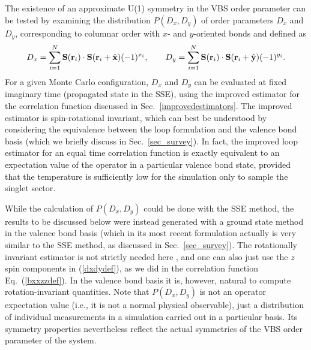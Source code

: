 \documentclass[draft,numberedheadings]{aipproc}
\begin{document}
The existence of an approximate U(1) symmetry in the VBS order parameter can be tested by examining the distribution $P(D_x,D_y)$ of order 
parameters $D_x$ and $D_y$, corresponding to columnar order with $x$- and $y$-oriented bonds and defined as
\begin{equation}
D_{x}=\sum_{i=1}^N {\bf S}({\bf r}_i)\cdot {\bf S}({\bf r}_i+\hat {\bf x})(-1)^{x_i} ,~~~~~~
D_{y}=\sum_{i=1}^N {\bf S}({\bf r}_i)\cdot {\bf S}({\bf r}_i+\hat {\bf y})(-1)^{y_i} .
\label{dxdydef}
\end{equation}
For a given Monte Carlo configuration, $D_x$ and $D_y$ can be evaluated at fixed imaginary time (propagated state in the SSE), using the improved 
estimator for the correlation function discussed in Sec.~\ref{improvedestimators}. The improved estimator is spin-rotational invariant, which can best be 
understood by considering the equivalence between the loop formulation and the valence bond basis \cite{nachtergale,evertz1,awshg} (which we briefly 
discuss in Sec.~\ref{sec_survey}). In fact, the improved loop estimator for an equal time correlation function is exactly equivalent to an expectation 
value of the operator in a particular valence bond state, provided that the temperature is sufficiently low for the simulation only to sample the 
singlet sector. 

While the calculation of $P(D_x,D_y)$ could be done with the SSE method, the results to be discussed below were instead generated with a ground state 
method in the valence bond basis (which in its most recent formulation \cite{awshg} actually is very similar to the SSE method, as discussed in 
Sec.~\ref{sec_survey}). The rotationally invariant estimator is not strictly needed here \cite{arnab}, and one can also just use the $z$ spin 
components in (\ref{dxdydef}), as we did in the correlation function Eq.~(\ref{bxxzzdef}). In the valence bond basis it is, however, natural to compute 
rotation-invariant quantities. Note that $P(D_x,D_y)$ is not an operator expectation value (i.e., it is not a normal physical observable), just a 
distribution of individual measurements in a simulation carried out in a particular basis. Its symmetry properties nevertheless reflect the actual
symmetries of the VBS order parameter of the system. 
\end{document}

